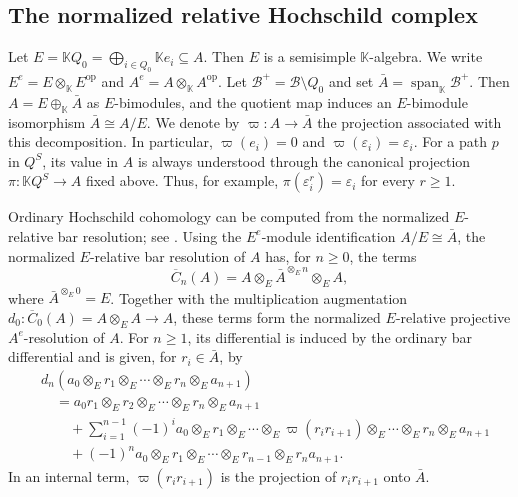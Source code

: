 \documentclass[11pt,a4paper,reqno]{amsart}
\newcommand{\mK}{\mathbb K}
\newcommand{\mB}{\mathcal B}
\newcommand{\ep}{\varepsilon}
\theoremstyle{plain}
\theoremstyle{definition}
\numberwithin{equation}{section}
\begin{document}
	\subsection{The normalized relative Hochschild complex}
	\label{subsec:normalized-relative-Hochschild}
	
	Let
	$E=\mK Q_0=\bigoplus_{i\in Q_0}\mK e_i\subseteq A$.
	Then $E$ is a semisimple $\mK$-algebra. We write
	$E^e=E\otimes_{\mK}E^{\mathrm{op}}$ and $A^e=A\otimes_{\mK}A^{\mathrm{op}}$.
	Let $\mB^+=\mB\setminus Q_0$ and set $\bar A=\operatorname{span}_{\mK}\mB^+$.
	Then $A=E\oplus_{\mK}\bar A$ as $E$-bimodules, and the quotient map induces	an $E$-bimodule isomorphism $\bar A\cong A/E$. We denote by $\varpi:A\longrightarrow\bar A$	the projection associated with this decomposition. In particular,
	$\varpi(e_i)=0$ and $\varpi(\ep_i)=\ep_i$. For a path $p$ in $Q^S$, its
	value in $A$ is always understood through the canonical projection
	$\pi:\mK Q^S\to A$ fixed above. Thus, for example,
	$\pi(\ep_i^r)=\ep_i$ for every $r\geq1$.
	
	Ordinary Hochschild cohomology can be computed from the normalized
	$E$-relative bar resolution; see \cite{GS86,Wit19}.
	Using the $E^e$-module identification $A/E\cong\bar A$, the normalized
	$E$-relative bar resolution of $A$ has, for $n\geq0$, the terms
	\[
	\overline C_n(A)
	=
	A\otimes_E\bar A^{\otimes_E n}\otimes_E A,
	\]
	where $\bar A^{\otimes_E0}=E$. Together with the multiplication augmentation
	$d_0:\overline C_0(A)=A\otimes_E A\to A$, these terms form the normalized
	$E$-relative projective $A^e$-resolution of $A$. For $n\geq1$, its
	differential is induced by the ordinary bar differential and is given, for
	$r_i\in\bar A$, by
	\[
	\begin{aligned}
		&d_n(
		a_0\otimes_E r_1\otimes_E\cdots\otimes_E r_n\otimes_E a_{n+1}
		)
		\\
		&\quad={}
		a_0r_1\otimes_E r_2\otimes_E\cdots\otimes_E r_n\otimes_E a_{n+1}
		\\
		&\qquad+
		\sum_{i=1}^{n-1}(-1)^i
		a_0\otimes_E r_1\otimes_E\cdots\otimes_E
		\varpi(r_ir_{i+1})\otimes_E\cdots\otimes_E r_n\otimes_E a_{n+1}
		\\
		&\qquad+(-1)^n
		a_0\otimes_E r_1\otimes_E\cdots\otimes_E r_{n-1}\otimes_E r_na_{n+1}.
	\end{aligned}
	\]
	In an internal term, $\varpi(r_ir_{i+1})$ is the projection of
	$r_ir_{i+1}$ onto $\bar A$.
	
\end{document}
